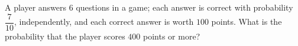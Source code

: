 A player answers $6$ questions in a game; each answer is correct with probability $\dfrac{7}{10}$, independently, and each correct answer is worth $100$ points. What is the probability that the player scores $400$ points or more?
